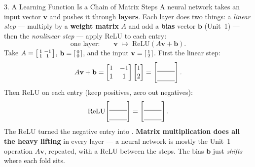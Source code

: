 \documentclass[10pt]{article}
\newcommand{\vv}{\mathbf{v}}
\newcommand{\bb}{\mathbf{b}}
\newcommand{\relu}{\mathrm{ReLU}}
\begin{document}
\begin{notesbox}{3. A Learning Function Is a Chain of Matrix Steps}
A neural network takes an input vector $\vv$ and pushes it through \textbf{layers}. Each layer does two
things: a \emph{linear step} --- multiply by a \textbf{weight matrix} $A$ and add a \textbf{bias} vector
$\bb$ (Unit~1) --- then the \emph{nonlinear step} --- apply ReLU to each entry:
\[
  \text{one layer:}\qquad \vv \;\longmapsto\; \relu(A\vv+\bb).
\]
Take $A=\begin{bsmallmatrix} 1 & -1\\ 1 & 1 \end{bsmallmatrix}$, $\bb=\begin{bsmallmatrix} 0\\ 0 \end{bsmallmatrix}$,
and the input $\vv=\begin{bsmallmatrix} 1\\ 2 \end{bsmallmatrix}$. First the linear step:
\[
  A\vv+\bb=\begin{bmatrix} 1 & -1\\ 1 & 1 \end{bmatrix}\begin{bmatrix} 1\\ 2 \end{bmatrix}
  =\begin{bmatrix}\rule{0pt}{1.1em}\blank{0.9cm}\\[2pt]\blank{0.9cm}\end{bmatrix}.
\]
Then ReLU on each entry (keep positives, zero out negatives):
\[
  \relu\!\begin{bmatrix}\rule{0pt}{1.1em}\blank{0.9cm}\\[2pt]\blank{0.9cm}\end{bmatrix}
  =\begin{bmatrix}\rule{0pt}{1.1em}\blank{0.9cm}\\[2pt]\blank{0.9cm}\end{bmatrix}.
\]
The ReLU turned the negative entry into \blank{1.2cm}. \textbf{Matrix multiplication does all the heavy
lifting} in every layer --- a neural network is mostly the Unit~1 operation $A\vv$, repeated, with a ReLU
between the steps. The bias $\bb$ just \emph{shifts} where each fold sits.
\end{notesbox}
\end{document}
